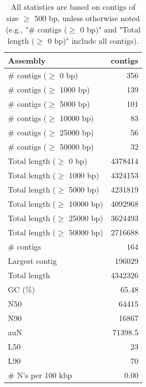 \documentclass[12pt,a4paper]{article}
\begin{document}
\begin{table}[ht]
\begin{center}
\caption{All statistics are based on contigs of size $\geq$ 500 bp, unless otherwise noted (e.g., "\# contigs ($\geq$ 0 bp)" and "Total length ($\geq$ 0 bp)" include all contigs).}
\begin{tabular}{|l*{1}{|r}|}
\hline
Assembly & contigs \\ \hline
\# contigs ($\geq$ 0 bp) & 356 \\ \hline
\# contigs ($\geq$ 1000 bp) & 139 \\ \hline
\# contigs ($\geq$ 5000 bp) & 101 \\ \hline
\# contigs ($\geq$ 10000 bp) & 83 \\ \hline
\# contigs ($\geq$ 25000 bp) & 56 \\ \hline
\# contigs ($\geq$ 50000 bp) & 32 \\ \hline
Total length ($\geq$ 0 bp) & 4378414 \\ \hline
Total length ($\geq$ 1000 bp) & 4324153 \\ \hline
Total length ($\geq$ 5000 bp) & 4231819 \\ \hline
Total length ($\geq$ 10000 bp) & 4092968 \\ \hline
Total length ($\geq$ 25000 bp) & 3624493 \\ \hline
Total length ($\geq$ 50000 bp) & 2716688 \\ \hline
\# contigs & 164 \\ \hline
Largest contig & 196029 \\ \hline
Total length & 4342326 \\ \hline
GC (\%) & 65.48 \\ \hline
N50 & 64415 \\ \hline
N90 & 16867 \\ \hline
auN & 71398.5 \\ \hline
L50 & 23 \\ \hline
L90 & 70 \\ \hline
\# N's per 100 kbp & 0.00 \\ \hline
\end{tabular}
\end{center}
\end{table}
\end{document}
